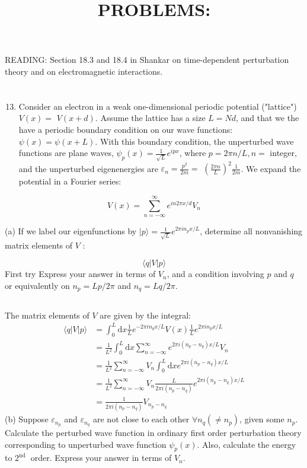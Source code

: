 \documentclass[12pt]{article}
\title{PROBLEMS: }
\author{}
\date{}
\begin{document}
\maketitle
READING: Section 18.3 and 18.4 in Shankar on time-dependent perturbation theory and on electromagnetic interactions.
\section{}
\begin{enumerate}
  \setcounter{enumi}{12}
  \item Consider an electron in a weak one-dimensional periodic potential ("lattice") $V(x)=$ $V(x+d)$. Assume the lattice has a size $L=N d$, and that we the have a periodic boundary condition on our wave functions: $\psi(x)=\psi(x+L)$. With this boundary condition, the unperturbed wave functions are plane waves, $\psi_{p}(x)=\frac{1}{\sqrt{L}} e^{i p x}$, where $p=2 \pi n / L, n=$ integer, and the unperturbed eigenenergies are $\varepsilon_{n}=\frac{p^{2}}{2 m}=$ $\left(\frac{2 \pi n}{L}\right)^{2} \frac{1}{2 m}$. We expand the potential in a Fourier series:
\end{enumerate}

$$
V(x)=\sum_{n=-\infty}^{\infty} e^{i n 2 \pi x / d} V_{n}
$$

(a) If we label our eigenfunctions by $|p\rangle=\frac{1}{\sqrt{L}} e^{2 \pi i n_{p} x / L}$, determine all nonvanishing matrix elements of $V$ :

$$
\langle q|V| p\rangle
$$First try
Express your answer in terms of $V_{n}$, and a condition involving $p$ and $q$ or equivalently on $n_{p}=L p / 2 \pi$ and $n_{q}=L q / 2 \pi$.
\subsection{}
The matrix elements of $V$ are given by the integral:
\begin{equation}
  \begin{aligned}
    \langle q|V| p\rangle &=\int_{0}^{L} \mathrm{d} x \frac{1}{L} e^{-2 \pi i n_{q} x / L} V(x) \frac{1}{L} e^{2 \pi i n_{p} x / L} \\
    &=\frac{1}{L^{2}} \int_{0}^{L} \mathrm{d} x \sum_{n=-\infty}^{\infty} e^{2 \pi i(n_{p}-n_{q}) x / L} V_{n} \\
    &=\frac{1}{L^{2}} \sum_{n=-\infty}^{\infty} V_{n} \int_{0}^{L} \mathrm{d} x e^{2 \pi i(n_{p}-n_{q}) x / L} \\
    &=\frac{1}{L^{2}} \sum_{n=-\infty}^{\infty} V_{n} \frac{L}{2 \pi i(n_{p}-n_{q})} e^{2 \pi i(n_{p}-n_{q}) x / L} \\
    &=\frac{1}{2 \pi i(n_{p}-n_{q})} V_{n_{p}-n_{q}}
\end{aligned}
\end{equation}
(b) Suppose $\varepsilon_{n_{p}}$ and $\varepsilon_{n_{q}}$ are not close to each other $\forall n_{q}\left(\neq n_{p}\right)$, given some $n_{p}$. Calculate the perturbed wave function in ordinary first order perturbation theory corresponding to unperturbed wave function $\psi_{p}(x)$. Also, calculate the energy to $2^{\text {nd }}$ order. Express your answer in terms of $V_{n}$.
\end{document}
